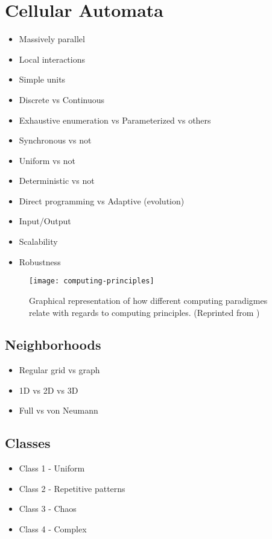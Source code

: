 \section{Cellular Automata}

\TODO

\begin{itemize}
    \item Massively parallel
    \item Local interactions
    \item Simple units
    \item Discrete vs Continuous
    \item Exhaustive enumeration vs Parameterized vs others
    \item Synchronous vs not
    \item Uniform vs not
    \item Deterministic vs not
    \item Direct programming vs Adaptive (evolution)
    \item Input/Output
    \item Scalability
    \item Robustness
\end{itemize}

\begin{figure}[!ht]
    \centering
    \texttt{[image: computing-principles]}
    \caption[Computing principles]{
        Graphical representation of how different computing paradigmes relate with regards to computing principles.
        (Reprinted from \cite{sipper1999emergence})
    }
    \label{fig:computing-principles}
\end{figure}

\subsection{Neighborhoods}

\begin{itemize}
    \item Regular grid vs graph
    \item 1D vs 2D vs 3D
    \item Full vs von Neumann
\end{itemize}

\subsection{Classes}

\begin{itemize}
    \item Class 1 - Uniform
    \item Class 2 - Repetitive patterns
    \item Class 3 - Chaos
    \item Class 4 - Complex
\end{itemize}

